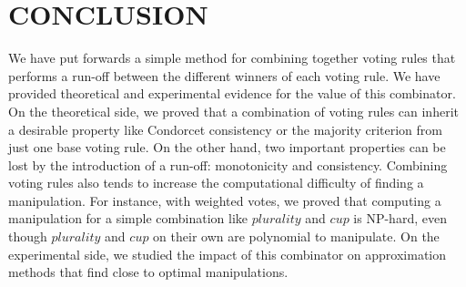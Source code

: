 \documentclass{ecai2012}
\begin{document}
\section{CONCLUSION}

We have put forwards a simple method for combining together
voting rules that performs a run-off between
the different winners of each voting rule.
We have provided theoretical and experimental
evidence for the value of this combinator. On the
theoretical side, we proved that a combination
of voting rules can inherit a desirable property like
Condorcet consistency or the majority criterion
from just one base voting rule. On the other
hand, two important properties can be lost by the
introduction of a run-off: monotonicity and
consistency. Combining voting rules also
tends to increase the computational difficulty
of finding a manipulation. For instance,
with weighted votes, we proved that
computing a manipulation for a simple
combination like $plurality$ and $cup$
is NP-hard, even though
$plurality$ and $cup$ on their own
are polynomial to manipulate.
On the experimental side,
we studied the impact of this combinator
on approximation methods that
find close to optimal manipulations.
\end{document}
